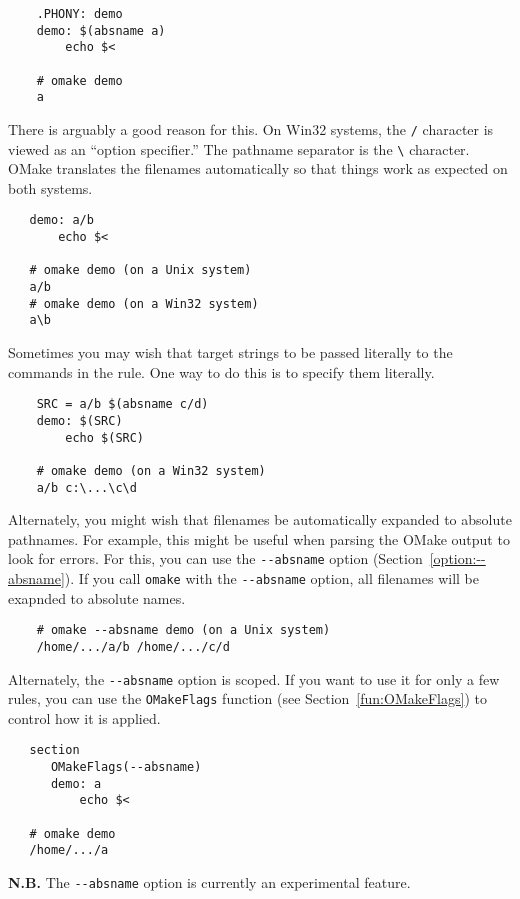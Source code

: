 \begin{verbatim}
    .PHONY: demo
    demo: $(absname a)
        echo $<

    # omake demo
    a
\end{verbatim}

There is arguably a good reason for this.  On Win32 systems, the \verb+/+ character is viewed as an
``option specifier.''  The pathname separator is the \verb+\+ character.  OMake translates the
filenames automatically so that things work as expected on both systems.

\begin{verbatim}
   demo: a/b
       echo $<

   # omake demo (on a Unix system)
   a/b
   # omake demo (on a Win32 system)
   a\b
\end{verbatim}

Sometimes you may wish that target strings to be passed literally to the commands in the rule.
One way to do this is to specify them literally.

\begin{verbatim}
    SRC = a/b $(absname c/d)
    demo: $(SRC)
        echo $(SRC)

    # omake demo (on a Win32 system)
    a/b c:\...\c\d
\end{verbatim}

Alternately, you might wish that filenames be automatically expanded to absolute pathnames.  For
example, this might be useful when parsing the OMake output to look for errors.  For this, you can
use the \verb+--absname+ option (Section~\ref{option:--absname}).  If you call \verb+omake+ with the
\verb+--absname+ option, all filenames will be exapnded to absolute names.

\begin{verbatim}
    # omake --absname demo (on a Unix system)
    /home/.../a/b /home/.../c/d
\end{verbatim}

Alternately, the \verb+--absname+ option is scoped.  If you want to use it for only a few rules, you
can use the \verb+OMakeFlags+ function (see Section~\ref{fun:OMakeFlags}) to control how it is applied.
    
\begin{verbatim}
   section
      OMakeFlags(--absname)
      demo: a
          echo $<

   # omake demo
   /home/.../a
\end{verbatim}

\textbf{N.B.} The \verb+--absname+ option is currently an experimental feature.

